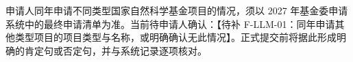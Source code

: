 \justifying
\NSFCBodyText

申请人同年申请不同类型国家自然科学基金项目的情况，须以 2027 年基金委申请系统中的最终申请清单为准。当前待申请人确认：【待补 F-LLM-01：同年申请其他类型项目的项目类型与名称，或明确确认无此情况】。正式提交前将据此形成明确的肯定句或否定句，并与系统记录逐项核对。
